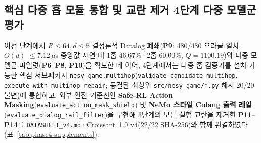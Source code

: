 \subsection{핵심 다중 홉 모듈 통합 및 교란 제거 4단계 다중 모델군 평가}\label{sec:phase4-supplements}
이전 단계에서 $R{\le}64, d{\le}5$ 결정론적 Datalog 폐쇄(\textbf{P9}: 480/480 오라클 일치, $O(d)$ $\le$7.12\,$\mu$s 중앙값 지연 대 1홉 46.67\%·2홉 60.00\%, $Q{=}1100.19$)와 다중 모델군 파일럿(\textbf{P6}--\textbf{P8}, \textbf{P10})을 확보한 데 이어, 4단계에서는 다중 홉 검증기를 설치 가능한 핵심 서브패키지 \texttt{nesy\_game.multihop}(\texttt{validate\_candidate\_multihop}, \texttt{execute\_with\_multihop\_repair}; 동결된 최상위 \texttt{src/nesy\_game/*.py} 해시 20/20 불변)에 통합하고, 외부 안전 기준선인 \textbf{Safe-RL Action Masking}(\texttt{evaluate\_action\_mask\_shield}) 및 \textbf{NeMo 스타일 Colang 출력 레일}(\texttt{evaluate\_dialog\_rail\_filter})을 구현해 3단계의 모든 실험 교란을 제거한 \textbf{P11}--\textbf{P14}를 \texttt{DATASHEET\_v4.md}·Croissant~1.0 v4(22/22 SHA-256)와 함께 완결하였다(표~\ref{tab:phase4-supplements}).

